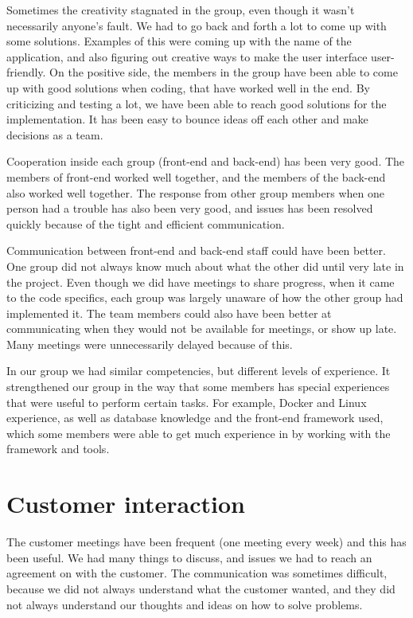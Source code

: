 Sometimes the creativity stagnated in the group, even though it wasn't necessarily anyone's fault. We had to go back and forth a lot to come up with some solutions. Examples of this were coming up with the name of the application, and also figuring out creative ways to make the user interface user-friendly. On the positive side, the members in the group have been able to come up with good solutions when coding, that have worked well in the end. By criticizing and testing a lot, we have been able to reach good solutions for the implementation. It has been easy to bounce ideas off each other and make decisions as a team.\newline

Cooperation inside each group (front-end and back-end) has been very good. The members of front-end worked well together, and the members of the back-end also worked well together. The response from other group members when one person had a trouble has also been very good, and issues has been resolved quickly because of the tight and efficient communication.\newline

Communication between front-end and back-end staff could have been better. One group did not always know much about what the other did until very late in the project. Even though we did have meetings to share progress, when it came to the code specifics, each group was largely unaware of how the other group had implemented it. The team members could also have been better at communicating when they would not be available for meetings, or show up late. Many meetings were unnecessarily delayed because of this.\newline

In our group we had similar competencies, but different levels of experience. It strengthened our group in the way that some members has special experiences that were useful to perform certain tasks. For example, Docker and Linux experience, as well as database knowledge and the front-end framework used, which some members were able to get much experience in by working with the framework and tools.

\section{Customer interaction}

The customer meetings have been frequent (one meeting every week) and this has been useful. We had many things to discuss, and issues we had to reach an agreement on with the customer. The communication was sometimes difficult, because we did not always understand what the customer wanted, and they did not always understand our thoughts and ideas on how to solve problems.\newline

